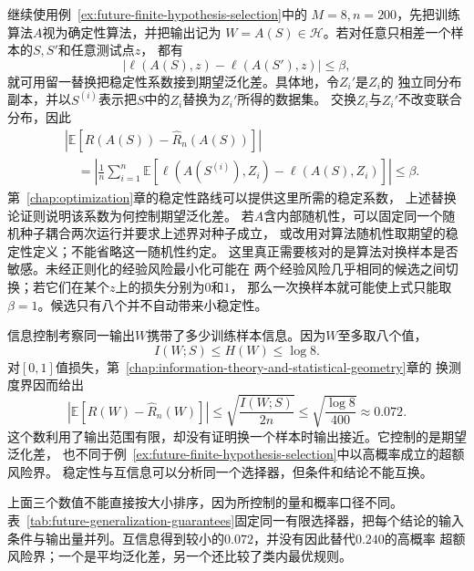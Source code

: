 \begin{example}[有限选择器的两类控制]
  \label{ex:future-stability-information-finite-selector}
  继续使用例~\ref{ex:future-finite-hypothesis-selection}中的
  \(M=8,n=200\)，先把训练算法\(A\)视为确定性算法，并把输出记为
  \(W=A(S)\in\mathcal H\)。若对任意只相差一个样本的\(S,S'\)和任意测试点\(z\)，
  都有
  \[
    \bigl|
      \ell(A(S),z)-\ell(A(S'),z)
    \bigr|
    \leq\beta,
  \]
  就可用留一替换把稳定性系数接到期望泛化差。具体地，令\(Z_i'\)是\(Z_i\)的
  独立同分布副本，并以\(S^{(i)}\)表示把\(S\)中的\(Z_i\)替换为\(Z_i'\)所得的数据集。
  交换\(Z_i\)与\(Z_i'\)不改变联合分布，因此
  \begin{align*}
    &\left|
      \mathbb{E}\!\left[
        R(A(S))-\widehat R_n(A(S))
      \right]
    \right|
    \\
    &\quad=
    \left|
      \frac1n\sum_{i=1}^n
      \mathbb{E}\!\left[
        \ell(A(S^{(i)}),Z_i)-\ell(A(S),Z_i)
      \right]
    \right|
    \leq\beta.
  \end{align*}
  第~\ref{chap:optimization}章的稳定性路线可以提供这里所需的稳定系数，
  上述替换论证则说明该系数为何控制期望泛化差。
  若\(A\)含内部随机性，可以固定同一个随机种子耦合两次运行并要求上述界对种子成立，
  或改用对算法随机性取期望的稳定性定义；不能省略这一随机性约定。
  这里真正需要核对的是算法对换样本是否敏感。未经正则化的经验风险最小化可能在
  两个经验风险几乎相同的候选之间切换；若它们在某个\(z\)上的损失分别为\(0\)和\(1\)，
  那么一次换样本就可能使上式只能取\(\beta=1\)。候选只有八个并不自动带来小稳定性。

  信息控制考察同一输出\(W\)携带了多少训练样本信息。因为\(W\)至多取八个值，
  \[
    I(W;S)\leq H(W)\leq\log 8.
  \]
  对\([0,1]\)值损失，第~\ref{chap:information-theory-and-statistical-geometry}章的
  换测度界因而给出
  \[
    \left|
      \mathbb{E}\!\left[
        R(W)-\widehat R_n(W)
      \right]
    \right|
    \leq
    \sqrt{\frac{I(W;S)}{2n}}
    \leq
    \sqrt{\frac{\log8}{400}}
    \approx0.072.
  \]
  这个数利用了输出范围有限，却没有证明换一个样本时输出接近。它控制的是期望泛化差，
  也不同于例~\ref{ex:future-finite-hypothesis-selection}中以高概率成立的超额风险界。
  稳定性与互信息可以分析同一个选择器，但条件和结论不能互换。
\end{example}

上面三个数值不能直接按大小排序，因为所控制的量和概率口径不同。
表~\ref{tab:future-generalization-guarantees}固定同一有限选择器，把每个结论的输入
条件与输出量并列。互信息得到较小的$0.072$，并没有因此替代$0.240$的高概率
超额风险界；一个是平均泛化差，另一个还比较了类内最优规则。


